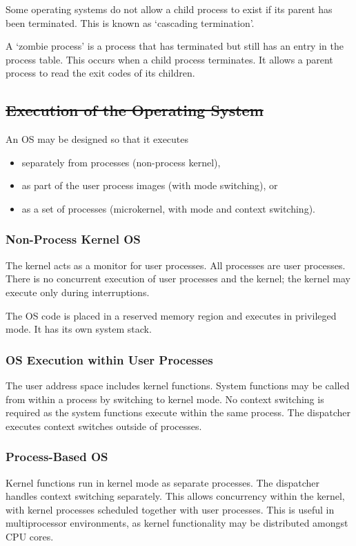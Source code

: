 Some operating systems do not allow a child process to exist if its parent has been terminated.
This is known as `cascading termination'.

A `zombie process' is a process that has terminated but still has an entry in the process table.
This occurs when a child process terminates.
It allows a parent process to read the exit codes of its children.

\subsection{\sout{Execution of the Operating System}}

An OS may be designed so that it executes
\begin{itemize}
  \item separately from processes (non-process kernel),
  \item as part of the user process images (with mode switching), or
  \item as a set of processes (microkernel, with mode and context switching).
\end{itemize}

\subsubsection{Non-Process Kernel OS}

The kernel acts as a monitor for user processes.
All processes are user processes.
There is no concurrent execution of user processes and the kernel; the kernel may execute only during interruptions.

The OS code is placed in a reserved memory region and executes in privileged mode.
It has its own system stack.

\subsubsection{OS Execution within User Processes}

The user address space includes kernel functions.
System functions may be called from within a process by switching to kernel mode.
No context switching is required as the system functions execute within the same process.
The dispatcher executes context switches outside of processes.

\subsubsection{Process-Based OS}

Kernel functions run in kernel mode as separate processes.
The dispatcher handles context switching separately.
This allows concurrency within the kernel, with kernel processes scheduled together with user processes.
This is useful in multiprocessor environments, as kernel functionality may be distributed amongst CPU cores.
